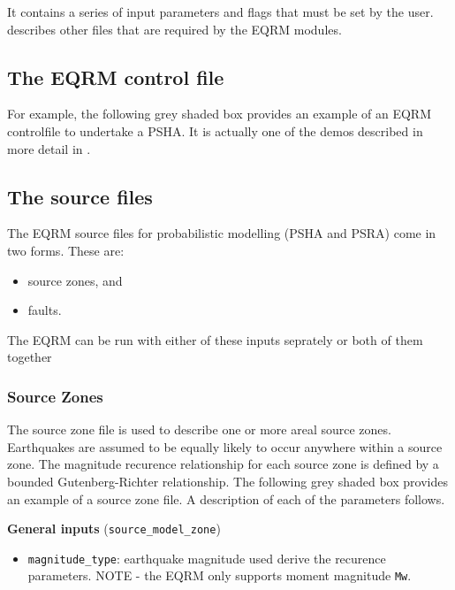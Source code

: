 It contains a series of input parameters and flags that must be set
by the user.  describes other files
that are required by the EQRM modules.

\subsection{The EQRM control file}
\label{sec:application-EQRMcf}




\clearpage For example, the following grey shaded box provides an
example of an EQRM controlfile to undertake a PSHA. It is actually
one of the demos described in more detail in
.




\clearpage
\subsection{The source files}

The EQRM source files for probabilistic modelling (PSHA and PSRA)
come in two forms. These are:
\begin{itemize}
\item source zones, and
\item faults.
\end{itemize}
The EQRM can be run with either of these inputs seprately or both of
them together


\subsubsection{Source Zones}
\label{sec:source-zone-file}

The source zone file is used to describe one or more areal source
zones. Earthquakes are assumed to be equally likely to occur
anywhere within a source zone. The magnitude recurence relationship
for each source zone is defined by a bounded Gutenberg-Richter
relationship. The following grey shaded box provides an example of a
source zone file. A description of each of the parameters follows.


\textbf{General inputs} (\texttt{source\_model\_zone})
\begin{itemize}
\item \texttt{magnitude\_type}: earthquake magnitude used derive the
recurence parameters. NOTE - the EQRM only supports moment magnitude
\texttt{Mw}.
\end{itemize}

